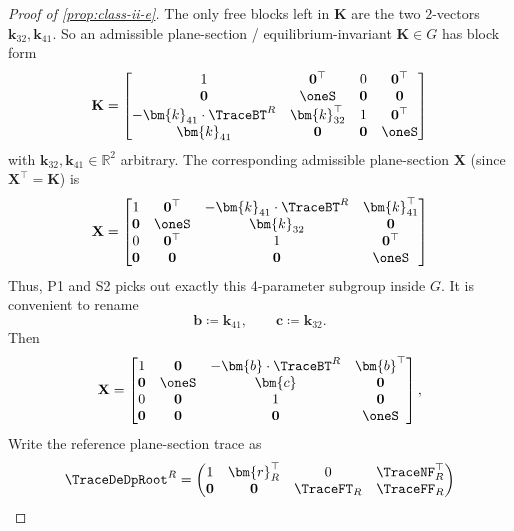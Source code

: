 \begin{proof}[Proof of \cref{prop:class-ii-e}]
The only free blocks left in \(\mathbf{K}\) are the two \(2\)-vectors
\(\bm{k}_{32},\bm{k}_{41}\).  So an admissible plane-section /
equilibrium-invariant \(\mathbf{K}\in G\) has block form
\begin{equation*}
  \mathbf{K} =
  \begin{bmatrix}
    1 & \mathbf{0}^\top       & 0 & \mathbf{0}^\top \\
    \mathbf{0} & \oneS        & \mathbf{0} & \mathbf{0} \\
    -\bm{k}_{41}\cdot\TraceBT^R & \bm{k}_{32}^\top & 1 & \mathbf{0}^\top \\
    \bm{k}_{41} & \mathbf{0}  & \mathbf{0} & \oneS
  \end{bmatrix}
\end{equation*}
with \(\bm{k}_{32},\bm{k}_{41}\in\mathbb{R}^2\) arbitrary. 
The corresponding admissible plane-section \(\mathbf{X}\) (since
\(\mathbf{X}^\top = \mathbf{K}\)) is
\begin{equation*}
  \mathbf{X} =
  \begin{bmatrix}
    1 & \mathbf{0}^\top & -\bm{k}_{41}\cdot\TraceBT^R & \bm{k}_{41}^\top \\
    \mathbf{0} & \oneS   & \bm{k}_{32} & \mathbf{0} \\
    0 & \mathbf{0}^\top  & 1 & \mathbf{0}^\top \\
    \mathbf{0} & \mathbf{0} & \mathbf{0} & \oneS
  \end{bmatrix}
\end{equation*}
Thus, P1 and S2 picks out exactly this 4‑parameter
subgroup inside \(G\). 
%
It is convenient to rename
\[
  \bm{b} \coloneq \bm{k}_{41},\qquad
  \bm{c} \coloneq \bm{k}_{32}.
\]
Then
\begin{equation*}
  \mathbf{X} =
  \begin{bmatrix}
    1 & \mathbf{0} & -\bm{b}\cdot {\TraceBT}^R & \bm{b}^\top \\
    \mathbf{0} & \oneS  & \bm{c} & \mathbf{0} \\
    0 & \mathbf{0} & 1 & \mathbf{0} \\
    \mathbf{0} & \mathbf{0} & \mathbf{0} & \oneS
  \end{bmatrix},
\end{equation*}
%
Write the reference plane-section trace as
\begin{equation*}
  \TraceDeDpRoot^R =
  \begin{pmatrix}
    1          & \bm{r}_R^\top & 0 & {\TraceNF}_R^\top \\
    \mathbf{0} & \mathbf{0}    & {\TraceFT}_R & {\TraceFF}_R \\

\end{pmatrix}
\end{equation*}
\end{proof}
